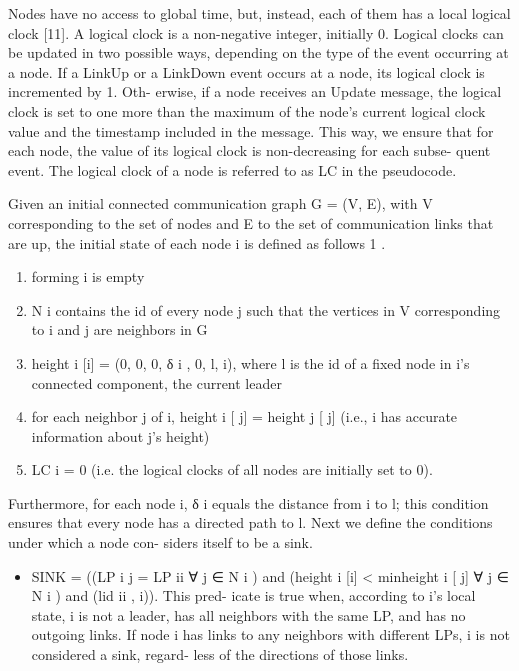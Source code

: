 \documentclass{article}
\begin{document}
Nodes have no access to global time, but, instead, each
of them has a local logical clock [11]. A logical clock is
a non-negative integer, initially 0. Logical clocks can be
updated in two possible ways, depending on the type of the
event occurring at a node. If a LinkUp or a LinkDown event
occurs at a node, its logical clock is incremented by 1. Oth-
erwise, if a node receives an Update message, the logical
clock is set to one more than the maximum of the node’s
current logical clock value and the timestamp included in
the message. This way, we ensure that for each node, the
value of its logical clock is non-decreasing for each subse-
quent event. The logical clock of a node is referred to as LC
in the pseudocode.

Given an initial connected communication graph G =
(V, E), with V corresponding to the set of nodes and E to
the set of communication links that are up, the initial state
of each node i is defined as follows 1 .
\begin{enumerate}
\item forming i is empty
\item N i contains the id of every node j such that the vertices
in V corresponding to i and j are neighbors in G
\item height i [i] = (0, 0, 0, δ i , 0, l, i), where l is the id of a
fixed node in i’s connected component, the current
leader
\item for each neighbor j of i, height i [ j] = height j [ j] (i.e., i
has accurate information about j’s height)
\item LC i = 0 (i.e. the logical clocks of all nodes are initially
set to 0).
\end{enumerate}
Furthermore, for each node i, δ i equals the distance from i
to l; this condition ensures that every node has a directed
path to l.
Next we define the conditions under which a node con-
siders itself to be a sink.
\begin{itemize}
\item SINK = ((LP i j = LP ii ∀ j ∈ N i ) and (height i [i] <
min{height i [ j] ∀ j ∈ N i }) and (lid ii , i)). This pred-
icate is true when, according to i’s local state, i is not
a leader, has all neighbors with the same LP, and has
no outgoing links. If node i has links to any neighbors
with different LPs, i is not considered a sink, regard-
less of the directions of those links.
\end{itemize}
\end{document}
